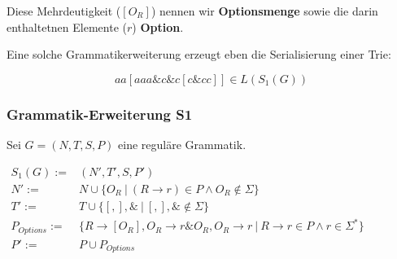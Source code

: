 \documentclass[a4paper,12pt]{article}
\begin{document}
Diese Mehrdeutigkeit ($[O_R]$) nennen wir \textbf{Optionsmenge} sowie die darin enthaltetnen Elemente ($r$) \textbf{Option}. 

Eine solche Grammatikerweiterung erzeugt eben die Serialisierung einer Trie:

\[ aa[aaa\&c\&c[c\&cc]]\in L(S_1(G))\]

\subsubsection*{Grammatik-Erweiterung S1}

Sei $G = (N,T,S,P)$ eine reguläre Grammatik.

$
\begin{array}{rl}
  S_1(G) :=& (N', T', S, P') \\
  N' :=& N \cup \{ O_R\ |\ (R\rightarrow r)\in P\land O_R \notin \Sigma\}\\
  T' :=& T \cup \{[ , ], \&\ |\ [,],\&\notin \Sigma \}\\
  P_{Options} :=& \{R \rightarrow [O_R], O_R \rightarrow r\& O_R, O_R \rightarrow r \ \vert\ R\rightarrow r\in P \land r\in \Sigma^*\} \\
  P' :=& P \cup P_{Options} 
\end{array}
$
\end{document}
